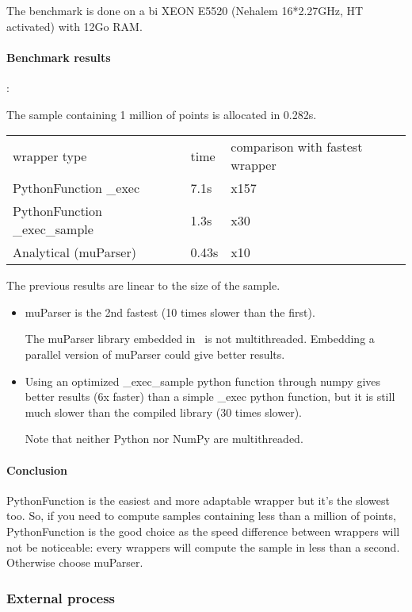 The benchmark is done on a bi XEON E5520 (Nehalem 16*2.27GHz, HT activated) with 12Go RAM.


\paragraph{Benchmark results}:

The sample containing 1 million of points is allocated in 0.282s.

\begin{tabular}{lll}
  wrapper type & time & comparison with fastest wrapper \\
  PythonFunction \_exec & 7.1s & x157 \\
  PythonFunction \_exec\_sample & 1.3s & x30 \\
  Analytical (muParser) & 0.43s & x10 \\
\end{tabular}

The previous results are linear to the size of the sample.

\begin{itemize}
\item muParser is the 2nd fastest (10 times slower than the first).

  The muParser library embedded in \OT\ is not multithreaded. Embedding a parallel version of muParser could give better results.
\item Using an optimized \_exec\_sample python function through numpy gives better results (6x faster) than a simple \_exec python function, but it is still much slower than the compiled library (30 times slower).

  Note that neither Python nor NumPy are multithreaded.
\end{itemize}


\paragraph{Conclusion} PythonFunction is the easiest and more adaptable wrapper but it's the slowest too. So, if you need to compute samples containing less than a million of points, PythonFunction is the good choice as the speed difference between wrappers will not be noticeable: every wrappers will compute the sample in less than a second. Otherwise choose muParser.




\subsubsection{External process}

